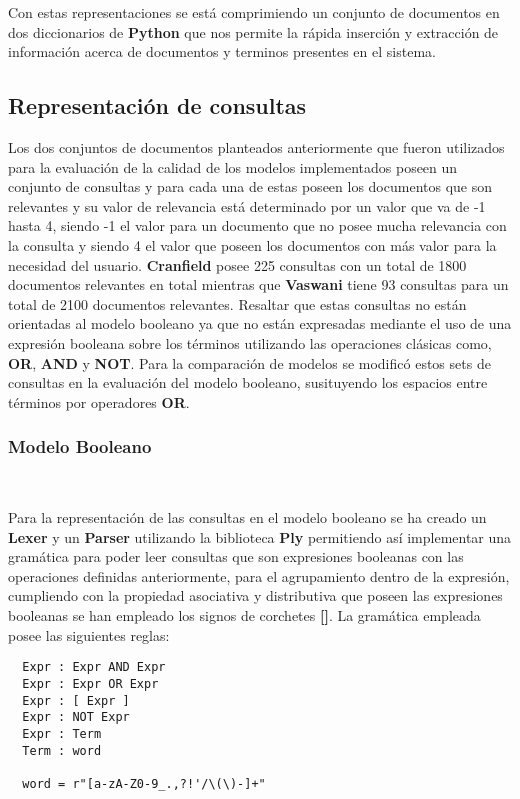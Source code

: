 \documentclass{llncs}
\begin{document}
Con estas representaciones se está comprimiendo un conjunto de documentos en dos diccionarios de {\bfseries Python} que nos permite la rápida inserción y extracción de información acerca de documentos y terminos presentes en el sistema.

\subsection{Representación de consultas}

Los dos conjuntos de documentos planteados anteriormente que fueron utilizados para la evaluación de la calidad de los modelos implementados poseen un conjunto de consultas y para cada una de estas poseen los documentos que son relevantes y su valor de relevancia está determinado por un valor que va de -1 hasta 4, siendo -1 el valor para un documento que no posee mucha relevancia con la consulta y siendo 4 el valor que poseen los documentos con más valor para la necesidad del usuario. {\bfseries Cranfield} posee 225 consultas con un total de 1800 documentos relevantes en total mientras que {\bfseries Vaswani} tiene 93 consultas para un total de 2100 documentos relevantes. Resaltar que estas consultas no están orientadas al modelo booleano ya que no están expresadas mediante el uso de una expresión booleana sobre los términos utilizando las operaciones clásicas como, {\bfseries OR}, {\bfseries AND} y {\bfseries NOT}. Para la comparación de modelos se modificó estos sets de consultas en la evaluación del modelo booleano, susituyendo los espacios entre términos por operadores {\bfseries OR}.

\subsubsection{Modelo Booleano}\

Para la representación de las consultas en el modelo booleano se ha creado un {\bfseries Lexer} y un {\bfseries Parser} utilizando la biblioteca {\bfseries Ply} permitiendo así implementar una gramática para poder leer consultas que son expresiones booleanas con las operaciones definidas anteriormente, para el agrupamiento dentro de la expresión, cumpliendo con la propiedad asociativa y distributiva que poseen las expresiones booleanas se han empleado los signos de corchetes {\bfseries []}. La gramática empleada posee las siguientes reglas:

\begin{verbatim}
  Expr : Expr AND Expr 
  Expr : Expr OR Expr 
  Expr : [ Expr ]
  Expr : NOT Expr
  Expr : Term
  Term : word

  word = r"[a-zA-Z0-9_.,?!'/\(\)-]+"
\end{verbatim}
\end{document}
